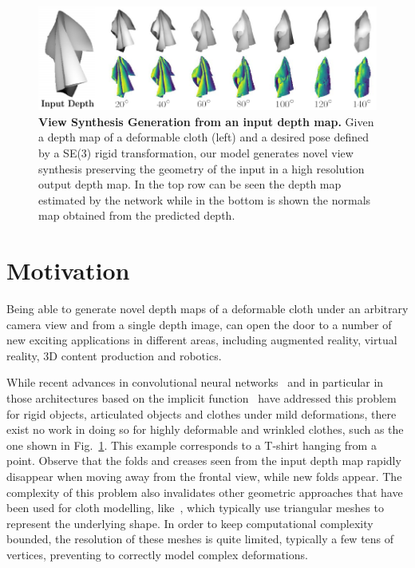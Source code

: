 \begin{figure}
\begin{center}
    \includegraphics[width=\linewidth]{main/chapter04/data/ipalm_cvpr_image_teaser.pdf}
\end{center}
    \caption[View Synthesis Generation from an input depth map]{\textbf{View Synthesis Generation from an input depth map.} Given a depth map of a deformable cloth (left) and a desired pose defined by a SE(3) rigid transformation, our model generates novel view synthesis preserving the geometry of the input in a high resolution output depth map. In the top row can be seen the depth map estimated by the network while in the bottom is shown the normals map obtained from the predicted depth.}
    \label{fig:teaser}
\end{figure}

\section{Motivation}

Being able to generate novel depth maps of a deformable cloth under an arbitrary camera view and from a single depth image, can open the door to a number of new exciting applications in different areas, including augmented reality, virtual reality, 3D content production and robotics.

While recent advances in  convolutional neural networks~\cite{varley2017shape, zhou2020learning,haeni2020corn,yan2016perspective} and in particular in those architectures based on the   implicit function~\cite{qiang-nips-2019, chibane20ifnet} have addressed this problem for rigid objects, articulated objects and clothes under mild deformations, there exist no work in doing so for highly deformable and wrinkled clothes, such as the one shown in Fig.~\ref{fig:teaser}. This example corresponds to a T-shirt hanging from a point. Observe that the folds and creases seen from the input depth map rapidly disappear when moving away from the frontal view, while new folds appear. The complexity of this problem also invalidates other geometric approaches that have been used for cloth modelling, like~\cite{salzmann-2010, pumarola2018geometry, golyanik2018hdm, Tsoli_2019_ICCV}, which typically use triangular meshes to represent the underlying shape. In order to keep computational complexity bounded, the resolution of these meshes is quite limited, typically a few tens of vertices, preventing to correctly model complex deformations. 

